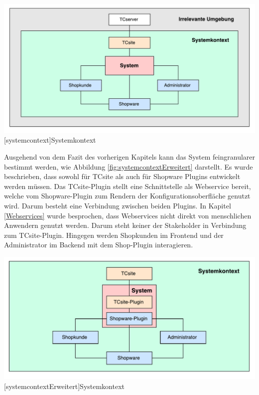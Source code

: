 \documentclass[11pt, a4paper, titlepage, listof=totoc, bibliography=totoc, index=totoc, twoside, openright, headings=normal]{scrreprt}
\begin{document}
\vspace{1em}
\begin{minipage}{\linewidth}
	\centering
	\includegraphics[width=0.8\linewidth]{Abbildungen/systemcontext.pdf}
	[systemcontext]{Systemkontext}
	\label{fig:systemcontext}
\end{minipage}
\vspace{1em}

Ausgehend von dem Fazit des vorherigen Kapitels kann das System feingranularer bestimmt werden, wie Abbildung \ref{fig:systemcontextErweitert} darstellt. Es wurde beschrieben, dass sowohl für TCsite als auch für Shopware Plugins entwickelt werden müssen. Das TCsite-Plugin stellt eine Schnittstelle als Webservice bereit, welche vom Shopware-Plugin zum Rendern der Konfigurationsoberfläche genutzt wird. Darum besteht eine Verbindung zwischen beiden Plugins.
In Kapitel \ref{Webservices} wurde besprochen, dass Webservices nicht direkt von menschlichen Anwendern genutzt werden. Darum steht keiner der Stakeholder in Verbindung zum TCsite-Plugin. Hingegen werden Shopkunden im Frontend und der Administrator im Backend mit dem Shop-Plugin interagieren.

\vspace{1em}
\begin{minipage}{\linewidth}
	\centering
	\includegraphics[width=0.8\linewidth]{Abbildungen/systemcontextErweitert.pdf}
	[systemcontextErweitert]{Systemkontext}
	\label{fig:systemcontextErweitert}
\end{minipage}
\vspace{1em}
\end{document}
